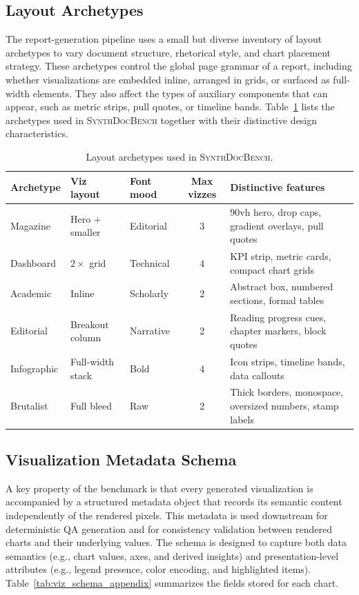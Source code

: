 \documentclass{article} %
\begin{document}
\subsection{Layout Archetypes}
\label{app:archetypes}

The report-generation pipeline uses a small but diverse inventory of layout archetypes to
vary document structure, rhetorical style, and chart placement strategy. These archetypes
control the global page grammar of a report, including whether visualizations are embedded
inline, arranged in grids, or surfaced as full-width elements. They also affect the types
of auxiliary components that can appear, such as metric strips, pull quotes, or timeline
bands. Table~\ref{tab:archetypes_appendix} lists the archetypes used in
\textsc{SynthDocBench} together with their distinctive design characteristics.

\begin{table}[htbp]
\centering
\small
\caption{Layout archetypes used in \textsc{SynthDocBench}.}
\label{tab:archetypes_appendix}
\begin{tabular}{lllcp{5.5cm}}
\toprule
\textbf{Archetype} & \textbf{Viz layout} & \textbf{Font mood} & \textbf{Max vizzes} & \textbf{Distinctive features} \\
\midrule
Magazine    & Hero + smaller   & Editorial  & 3 & 90vh hero, drop caps, gradient overlays, pull quotes \\
Dashboard   & $2\times$ grid   & Technical  & 4 & KPI strip, metric cards, compact chart grids \\
Academic    & Inline           & Scholarly  & 2 & Abstract box, numbered sections, formal tables \\
Editorial   & Breakout column  & Narrative  & 2 & Reading progress cues, chapter markers, block quotes \\
Infographic & Full-width stack & Bold       & 4 & Icon strips, timeline bands, data callouts \\
Brutalist   & Full bleed       & Raw        & 2 & Thick borders, monospace, oversized numbers, stamp labels \\
\bottomrule
\end{tabular}
\end{table}

\subsection{Visualization Metadata Schema}
\label{app:viz_schema}

A key property of the benchmark is that every generated visualization is accompanied by a
structured metadata object that records its semantic content independently of the rendered
pixels. This metadata is used downstream for deterministic QA generation and for
consistency validation between rendered charts and their underlying values. The schema is
designed to capture both data semantics (e.g., chart values, axes, and derived insights)
and presentation-level attributes (e.g., legend presence, color encoding, and highlighted
items). Table~\ref{tab:viz_schema_appendix} summarizes the fields stored for each chart.
\end{document}
